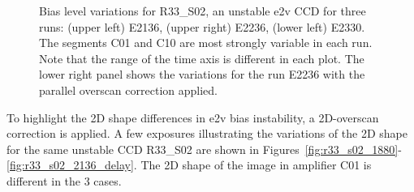 \begin{figure}[htbp]
\begin{minipage}[b]{0.45\textwidth}
\end{minipage}
\caption{Bias level variations for R33\_S02, an unstable e2v CCD for three runs:  (upper left) E2136, (upper right) E2236, (lower left) E2330.  The segments C01 and C10 are most strongly variable in each run.  Note that the range of the time axis is different in each plot. The lower right panel shows the variations for the run E2236 with the parallel overscan correction applied.}
\label{fig:r33_s02_bias}
\end{figure}

To highlight the 2D shape differences in e2v bias instability, a 2D-overscan correction
is applied. A few exposures illustrating the variations of the 2D shape
for the same unstable CCD R33\_S02 are shown in Figures~\ref{fig:r33_s02_1880}-\ref{fig:r33_s02_2136_delay}. The 2D shape of the image in
amplifier C01 is different in the 3 cases.

